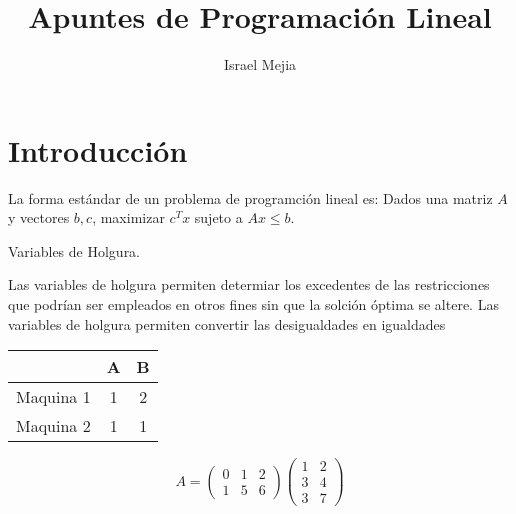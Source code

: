 \documentclass{article}
\title{Apuntes de Programación Lineal}
\author{Israel Mejia}
\begin{document}
\maketitle
\tableofcontents
\section{Introducción}


La forma estándar de un problema de programción lineal es:
Dados una matriz $A$ y vectores $b,c$, maximizar $c^Tx$ sujeto a
$Ax\leq b$.

Variables de Holgura.

Las variables de holgura permiten determiar los excedentes de las
restricciones que podrían ser empleados en otros fines sin que la
solción óptima se altere.
Las variables de holgura permiten convertir las desigualdades en
igualdades


\begin{tabular}{|c|c|c|}
  &A&B\\
  \hline
  Maquina 1&1&2\\
  \hline
  Maquina 2&1&1

\end{tabular}
\begin{equation*}
  \label{eq:1}
 A= \begin{pmatrix}
    0&1&2\\
    1&5&6
  \end{pmatrix}
  \begin{pmatrix}
    1&2\\
    3&4\\
    3&7
  \end{pmatrix}
\end{equation*}
\end{document}

